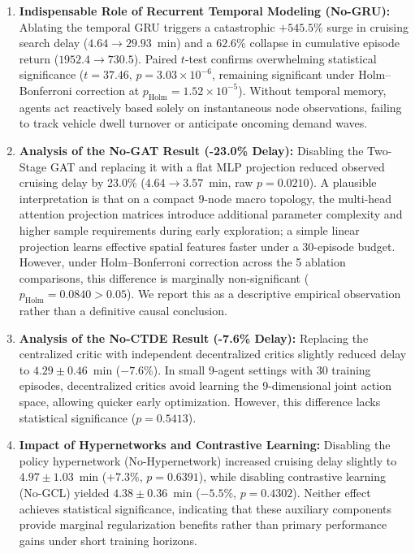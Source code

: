 \documentclass[journal]{IEEEtran}
\begin{document}
\begin{enumerate}
    \item \textbf{Indispensable Role of Recurrent Temporal Modeling (No-GRU):} Ablating the temporal GRU triggers a catastrophic $+545.5\%$ surge in cruising search delay ($4.64 \to 29.93$~min) and a $62.6\%$ collapse in cumulative episode return ($1952.4 \to 730.5$). Paired $t$-test confirms overwhelming statistical significance ($t = 37.46, \, p = 3.03 \times 10^{-6}$, remaining significant under Holm--Bonferroni correction at $p_{\text{Holm}} = 1.52 \times 10^{-5}$). Without temporal memory, agents act reactively based solely on instantaneous node observations, failing to track vehicle dwell turnover or anticipate oncoming demand waves.
    \item \textbf{Analysis of the No-GAT Result (-23.0\% Delay):} Disabling the Two-Stage GAT and replacing it with a flat MLP projection reduced observed cruising delay by 23.0\% ($4.64 \to 3.57$~min, raw $p = 0.0210$). A plausible interpretation is that on a compact 9-node macro topology, the multi-head attention projection matrices introduce additional parameter complexity and higher sample requirements during early exploration; a simple linear projection learns effective spatial features faster under a 30-episode budget. However, under Holm--Bonferroni correction across the 5 ablation comparisons, this difference is marginally non-significant ($p_{\text{Holm}} = 0.0840 > 0.05$). We report this as a descriptive empirical observation rather than a definitive causal conclusion.
    \item \textbf{Analysis of the No-CTDE Result (-7.6\% Delay):} Replacing the centralized critic with independent decentralized critics slightly reduced delay to $4.29 \pm 0.46$~min ($-7.6\%$). In small 9-agent settings with 30 training episodes, decentralized critics avoid learning the 9-dimensional joint action space, allowing quicker early optimization. However, this difference lacks statistical significance ($p = 0.5413$).
    \item \textbf{Impact of Hypernetworks and Contrastive Learning:} Disabling the policy hypernetwork (No-Hypernetwork) increased cruising delay slightly to $4.97 \pm 1.03$~min ($+7.3\%$, $p = 0.6391$), while disabling contrastive learning (No-GCL) yielded $4.38 \pm 0.36$~min ($-5.5\%$, $p = 0.4302$). Neither effect achieves statistical significance, indicating that these auxiliary components provide marginal regularization benefits rather than primary performance gains under short training horizons.
\end{enumerate}
\end{document}
